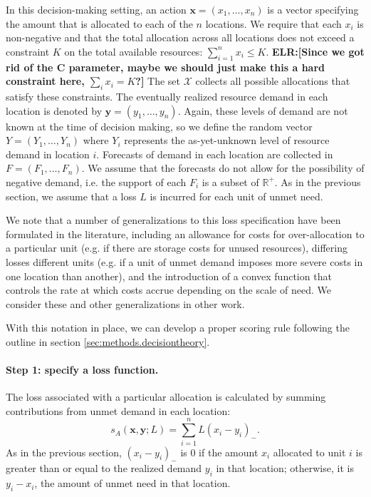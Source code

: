 \documentclass{article}
\def\elr#1{{\color{cyan}\textbf{ELR:[#1]}}}
\begin{document}
In this decision-making setting, an action $\mathbf{x} = (x_1, \ldots, x_n)$ is a vector specifying the amount that is allocated to each of the $n$ locations. We require that each $x_i$ is non-negative and that the total allocation across all locations does not exceed a constraint $K$ on the total available resources: $\sum_{i=1}^n x_i \leq K$. \elr{Since we got rid of the C parameter, maybe we should just make this a hard constraint here, $\sum_i x_i = K$?} The set $\mathcal{X}$ collects all possible allocations that satisfy these constraints. The eventually realized resource demand in each location is denoted by $\mathbf{y} = (y_1, \ldots, y_n)$. Again, these levels of demand are not known at the time of decision making, so we define the random vector $Y = (Y_1, \ldots, Y_n)$ where $Y_i$ represents the as-yet-unknown level of resource demand in location $i$. Forecasts of demand in each location are collected in $F = (F_1, \ldots, F_n)$. We assume that the forecasts do not allow for the possibility of negative demand, i.e. the support of each $F_i$ is a subset of $\mathbb{R}^+$. As in the previous section, we assume that a loss $L$ is incurred for each unit of unmet need.

We note that a number of generalizations to this loss specification have been formulated in the literature, including an allowance for costs for over-allocation to a particular unit (e.g. if there are storage costs for unused resources), differing losses different units (e.g. if a unit of unmet demand imposes more severe costs in one location than another), and the introduction of a convex function that controls the rate at which costs accrue depending on the scale of need. We consider these and other generalizations in other work.

With this notation in place, we can develop a proper scoring rule following the outline in section \ref{sec:methods.decisiontheory}.

\paragraph{Step 1: specify a loss function.} The loss associated with a particular allocation is calculated by summing contributions from unmet demand in each location:
\begin{equation}
s_A(\mathbf{x}, \mathbf{y}; L) = \sum_{i=1}^n L (x_i - y_i)_-. \label{eqn:loss_fn}
\end{equation}
As in the previous section, $(x_i - y_i)_-$ is $0$ if the amount $x_i$ allocated to unit $i$ is greater than or equal to the realized demand $y_i$ in that location; otherwise, it is $y_i - x_i$, the amount of unmet need in that location.
\end{document}
